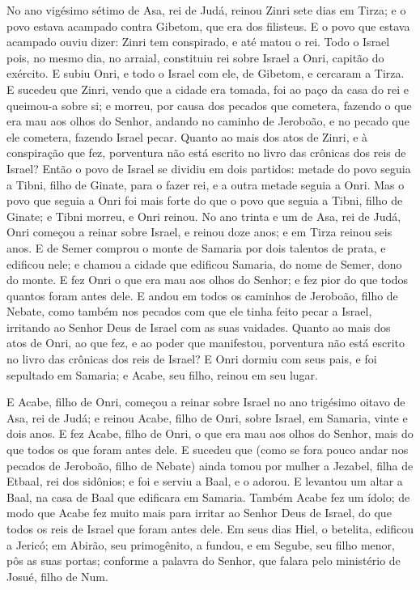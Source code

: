 No ano vigésimo sétimo de Asa, rei de Judá, reinou Zinri sete
dias em Tirza; e o povo estava acampado contra Gibetom, que era dos
filisteus. E o povo que estava acampado ouviu dizer: Zinri
tem conspirado, e até matou o rei. Todo o Israel pois, no mesmo dia,
no arraial, constituiu rei sobre Israel a Onri, capitão do exército.
E subiu Onri, e todo o Israel com ele, de Gibetom, e cercaram
a Tirza. E sucedeu que Zinri, vendo que a cidade era tomada,
foi ao paço da casa do rei e queimou-a sobre si; e morreu,
por causa dos pecados que cometera, fazendo o que era mau aos
olhos do Senhor, andando no caminho de Jeroboão, e no pecado que ele
cometera, fazendo Israel pecar. Quanto ao mais dos atos de
Zinri, e à conspiração que fez, porventura não está escrito no livro
das crônicas dos reis de Israel? Então o povo de Israel se
dividiu em dois partidos: metade do povo seguia a Tibni, filho de
Ginate, para o fazer rei, e a outra metade seguia a Onri. Mas
o povo que seguia a Onri foi mais forte do que o povo que seguia a
Tibni, filho de Ginate; e Tibni morreu, e Onri reinou. No ano
trinta e um de Asa, rei de Judá, Onri começou a reinar sobre Israel,
e reinou doze anos; e em Tirza reinou seis anos. E de Semer
comprou o monte de Samaria por dois talentos de prata, e edificou
nele; e chamou a cidade que edificou Samaria, do nome de Semer, dono
do monte. E fez Onri o que era mau aos olhos do Senhor; e fez
pior do que todos quantos foram antes dele. E andou em todos
os caminhos de Jeroboão, filho de Nebate, como também nos pecados
com que ele tinha feito pecar a Israel, irritando ao Senhor Deus de
Israel com as suas vaidades. Quanto ao mais dos atos de Onri,
ao que fez, e ao poder que manifestou, porventura não está escrito
no livro das crônicas dos reis de Israel? E Onri dormiu com
seus pais, e foi sepultado em Samaria; e Acabe, seu filho, reinou em
seu lugar.

E Acabe, filho de Onri, começou a reinar sobre Israel no ano
trigésimo oitavo de Asa, rei de Judá; e reinou Acabe, filho de Onri,
sobre Israel, em Samaria, vinte e dois anos. E fez Acabe,
filho de Onri, o que era mau aos olhos do Senhor, mais do que todos
os que foram antes dele.
 E sucedeu que (como se fora pouco andar nos pecados de Jeroboão,
filho de Nebate) ainda tomou por mulher a Jezabel, filha de Etbaal,
rei dos sidônios; e foi e serviu a Baal, e o adorou. E
levantou um altar a Baal, na casa de Baal que edificara em Samaria.
Também Acabe fez um ídolo; de modo que Acabe fez muito mais
para irritar ao Senhor Deus de Israel, do que todos os reis de
Israel que foram antes dele. Em seus dias Hiel, o betelita,
edificou a Jericó; em Abirão, seu primogênito, a fundou, e em
Segube, seu filho menor, pôs as suas portas; conforme a palavra do
Senhor, que falara pelo ministério de Josué, filho de Num.

